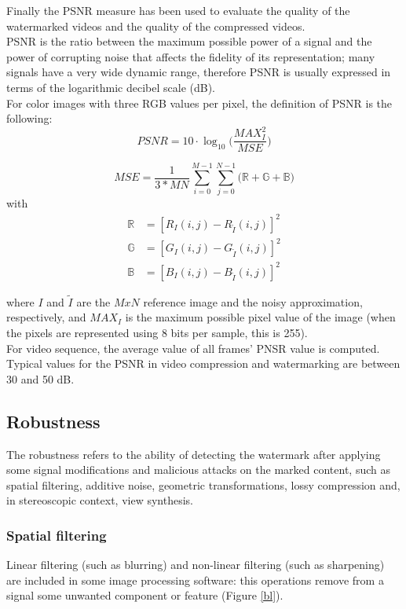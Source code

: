 Finally the PSNR measure has been used to evaluate the quality of the watermarked videos and the quality of the compressed videos.\\
PSNR is the ratio between the maximum possible power of a signal and the power of corrupting noise that affects the fidelity of its representation; many signals have a very wide dynamic range, therefore PSNR is usually expressed in terms of the logarithmic decibel scale (dB). \\
For color images with three RGB values per pixel, the definition of PSNR is the following:
\begin{equation}
PSNR = 10 \cdot \log_{10}\bigg( \frac{MAX_{I}^2}{MSE}\bigg)
\end{equation}

\begin{equation}
MSE  = \frac{1}{3*MN} \sum_{i=0}^{M-1}\sum_{j=0}^{N-1}\Big(\mathbb{R} +\mathbb{G} + \mathbb{B}  \Big)
\end{equation}
with 
\begin{align}
\mathbb{R} &= [R_{I}(i,j)-R_{\tilde{I}}(i,j)]^{2} \\
\mathbb{G} &= [G_{I}(i,j)-G_{\tilde{I}}(i,j)]^{2} \\
\mathbb{B} &= [B_{I}(i,j)-B_{\tilde{I}}(i,j)]^{2}
\end{align}

where $I$ and $\tilde{I}$ are the $MxN$ reference image and the noisy approximation, respectively, and $MAX_{I}$ is the maximum possible pixel value of the image (when the pixels are represented using 8 bits per sample, this is 255).\\
For video sequence, the average value of all frames' PNSR value is computed.
Typical values for the PSNR in video compression and watermarking are between 30 and 50 dB.

\subsection{Robustness}
The robustness refers to the ability of detecting the watermark after applying some signal modifications
and malicious attacks on the marked content, such as spatial filtering, additive noise, geometric  transformations, lossy compression and, in stereoscopic context, view synthesis.

\subsubsection{Spatial filtering}
Linear filtering (such as blurring) and non-linear filtering (such as sharpening) are included in some image processing software: this operations remove from a signal some unwanted component or feature (Figure \ref{bl}).

